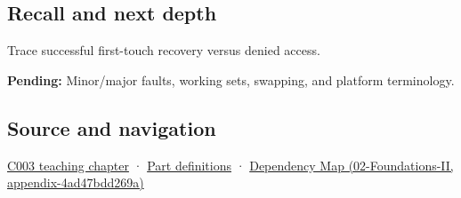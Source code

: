 \subsection{Recall and next depth}\label{appendix-cc0909a7ef14-recall-and-next-depth}

Trace successful first-touch recovery versus denied access.

\textbf{Pending:} Minor/major faults, working sets, swapping, and platform terminology.

\subsection{Source and navigation}\label{appendix-cc0909a7ef14-source-and-navigation}

\hyperref[01-foundations-i-ch002-where-the-bytes-live]{C003 teaching chapter} · \hyperref[appendix-fd090d982a15-m003---parts-41-60]{Part definitions} · \href{../02-Foundations-II/main.pdf\#nameddest=appendix-4ad47bdd269a}{Dependency Map (02-Foundations-II, appendix-4ad47bdd269a)}
